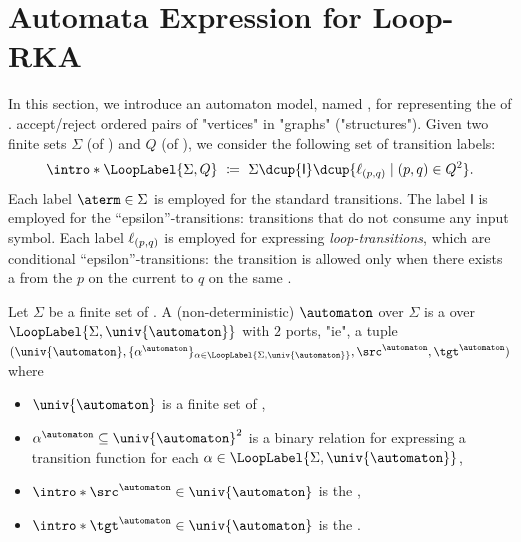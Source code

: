 \documentclass[a4paper,UKenglish,cleveref, autoref, thm-restate]{lipics-v2021}
\DeclarePairedDelimiter\set{\{}{\}}
\DeclarePairedDelimiter\tuple{(}{)}
\newcommand{\const}[1]{\mathsf{#1}}
\newcommand{\defeq}{\coloneq}
\newcommand{\id}{\const{I}}
\begin{document}
\section{Automata Expression for Loop-RKA}\label{section: loop-automata}
\AP
In this section,
we introduce an automaton model, named \emph{},
for representing the  of .
 accept/reject ordered pairs of "vertices" in "graphs" ("structures").
Given two finite sets $\Sigma$ (of ) and $Q$ (of \intro*{}),
we consider the following set of transition labels:
\AP
\[\intro*\LoopLabel{\Sigma, Q} ~\defeq~ \Sigma \dcup \set{\id} \dcup \set{\ell_{\tuple{p, q}} \mid \tuple{p, q} \in Q^2}.\]
Each label $\aterm \in \Sigma$
is employed for the standard transitions.
The label $\id$ is employed for the ``epsilon''-transitions:
transitions that do not consume any input symbol.
Each label $\ell_{\tuple{p, q}}$ is employed for expressing \emph{loop-transitions}, which are conditional ``epsilon''-transitions: the transition is allowed only when there exists a  from the  $p$ on the current  to $q$ on the same .

\begin{definition}\label{definition: loop-automata}
Let $\Sigma$ be a finite set of .
A (non-deterministic) \intro*{} $\automaton$ over $\Sigma$ is a  over $\LoopLabel{\Sigma, \univ{\automaton}}$ with $2$ ports, "ie",
a tuple $\tuple{\univ{\automaton}, \set{\alpha^{\automaton}}_{\alpha \in \LoopLabel{\Sigma, \univ{\automaton}}}, \src^{\automaton}, \tgt^{\automaton}}$ where
\begin{itemize}
    \item $\univ{\automaton}$ is a finite set of ,
    \item $\alpha^{\automaton} \subseteq \univ{\automaton}^2$ is a binary relation for expressing a transition function for each $\alpha \in \LoopLabel{\Sigma, \univ{\automaton}}$,
    \item $\intro*\src^{\automaton} \in \univ{\automaton}$ is the  ,
    \item $\intro*\tgt^{\automaton} \in \univ{\automaton}$ is the  .
\end{itemize}
\end{definition}
\end{document}
